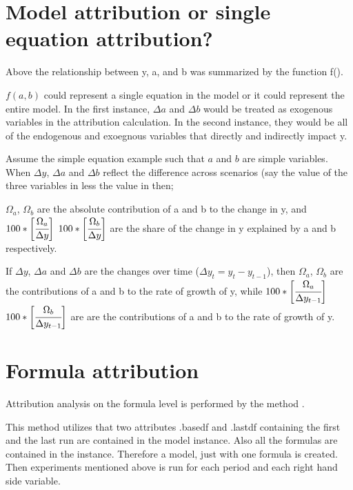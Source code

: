 \documentclass[letterpaper,10pt,english]{jupyterBook}
\begin{document}
\section{Model attribution or  single equation attribution?}
\label{\detokenize{content/06_ModelAnalytics/Attribution:model-attribution-or-single-equation-attribution}}
\sphinxAtStartPar
Above the relationship between y, a, and b was summarized by the function f().

\sphinxAtStartPar
\(f(a,b)\) could represent a single equation in the model or it could represent the entire model. In the first instance, \(\Delta a\) and \(\Delta b\) would be treated as exogenous variables in the attribution calculation.  In the second instance, they would be all of the endogenous and exoegnous variables that directly and indirectly impact y.

\sphinxAtStartPar
Assume the simple equation example such that  \(a\) and \(b\) are simple variables. When \(\Delta y\), \(\Delta a\) and \(\Delta b\) reflect the difference across scenarios (say the value of the three variables in  less the value in  then;

\sphinxAtStartPar
\(\Omega_a\), \(\Omega_b\) are the absolute contribution of a and b to the change in y, and
\(100*\bigg[\cfrac{\Omega_a}{\Delta y}\bigg]\)  \(100*\bigg[\cfrac{\Omega_b}{\Delta y}\bigg]\) are the share of the change in y explained by a and b respectively.

\sphinxAtStartPar
If \(\Delta y\), \(\Delta a\) and \(\Delta b\) are the changes over time (\(\Delta y_t=y_t-y_{t-1}\)), then \(\Omega_a\), \(\Omega_b\) are the contributions of a and b to the rate of growth of y, while \(100*\bigg[\cfrac{\Omega_a}{\Delta y_{t-1}}\bigg]\)  \(100*\bigg[\cfrac{\Omega_b}{\Delta y_{t-1}}\bigg]\) are are the contributions of a and b to the rate of growth of y.


\section{Formula attribution}
\label{\detokenize{content/06_ModelAnalytics/Attribution:formula-attribution}}
\sphinxAtStartPar
Attribution analysis on the formula level is performed by the method .

\sphinxAtStartPar
This method utilizes that two attributes .basedf and .lastdf containing the first and the last run are contained in the model instance. Also all the formulas are contained in the instance. Therefore a model, just with one formula \sphinxhyphen{} is created. Then experiments mentioned above is run for each period and each right hand side variable.
\end{document}
